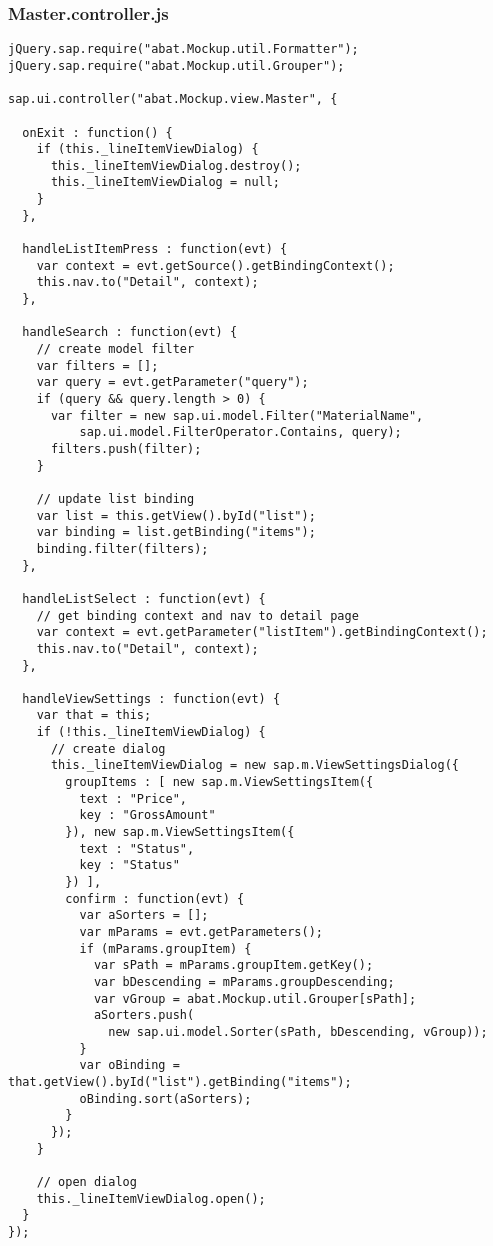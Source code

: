 \subsubsection*{Master.controller.js}
\begin{lstlisting}[frame=htrbl, label=lst:Master.controller.js]
jQuery.sap.require("abat.Mockup.util.Formatter");
jQuery.sap.require("abat.Mockup.util.Grouper");

sap.ui.controller("abat.Mockup.view.Master", {

  onExit : function() {
    if (this._lineItemViewDialog) {
      this._lineItemViewDialog.destroy();
      this._lineItemViewDialog = null;
    }
  },

  handleListItemPress : function(evt) {
    var context = evt.getSource().getBindingContext();
    this.nav.to("Detail", context);
  },

  handleSearch : function(evt) {
    // create model filter
    var filters = [];
    var query = evt.getParameter("query");
    if (query && query.length > 0) {
      var filter = new sap.ui.model.Filter("MaterialName",
          sap.ui.model.FilterOperator.Contains, query);
      filters.push(filter);
    }

    // update list binding
    var list = this.getView().byId("list");
    var binding = list.getBinding("items");
    binding.filter(filters);
  },

  handleListSelect : function(evt) {
    // get binding context and nav to detail page
    var context = evt.getParameter("listItem").getBindingContext();
    this.nav.to("Detail", context);
  },

  handleViewSettings : function(evt) {
    var that = this;
    if (!this._lineItemViewDialog) {
      // create dialog
      this._lineItemViewDialog = new sap.m.ViewSettingsDialog({
        groupItems : [ new sap.m.ViewSettingsItem({
          text : "Price",
          key : "GrossAmount"
        }), new sap.m.ViewSettingsItem({
          text : "Status",
          key : "Status"
        }) ],
        confirm : function(evt) {
          var aSorters = [];
          var mParams = evt.getParameters();
          if (mParams.groupItem) {
            var sPath = mParams.groupItem.getKey();
            var bDescending = mParams.groupDescending;
            var vGroup = abat.Mockup.util.Grouper[sPath];
            aSorters.push(
              new sap.ui.model.Sorter(sPath, bDescending, vGroup));
          }
          var oBinding = that.getView().byId("list").getBinding("items");
          oBinding.sort(aSorters);
        }
      });
    }

    // open dialog
    this._lineItemViewDialog.open();
  }
});
\end{lstlisting}

